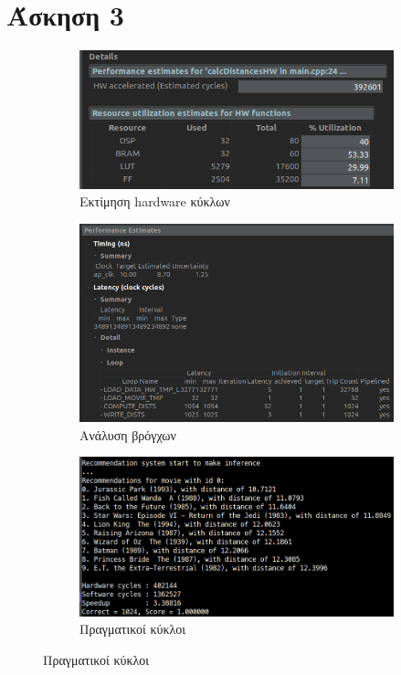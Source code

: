 \documentclass{article}
\newcommand{\eng}[1]{\foreignlanguage{english}{#1}} %
\begin{document}
\clearpage
\section*{Άσκηση 3}

\begin{figure}[ht]
   \centering
   \begin{subfigure}{0.6\textwidth}
       \includegraphics[width=\textwidth]{../photos/final/cycles.png} 
        \caption{Εκτίμηση \eng{hardware} κύκλων}
   \end{subfigure}
   \begin{subfigure}{0.6\textwidth}
       \includegraphics[width=\textwidth]{../photos/final/loops.png} 
        \caption{Ανάλυση βρόγχων}
   \end{subfigure}
   \begin{subfigure}{0.6\textwidth}
       \includegraphics[width=\textwidth]{../photos/final/results.png} 
       \caption{Πραγματικοί κύκλοι}
   \end{subfigure}
\end{figure}
\end{document}
